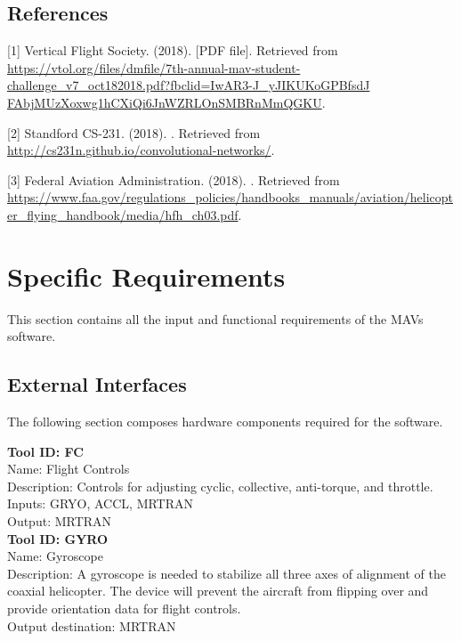\documentclass[onecolumn, oneside, letterpaper, draftclsnofoot, 10pt, compsoc]{IEEEtran}
\begin{document}
\subsection{References}
[1]
\newblock Vertical Flight Society. (2018).
 [PDF file].
\newblock Retrieved from \url{https://vtol.org/files/dmfile/7th-annual-mav-student-challenge_v7_oct182018.pdf?fbclid=IwAR3-J_yJIKUKoGPBfsdJ}\\ \url{FAbjMUzXoxwg1hCXiQi6JnWZRLOnSMBRnMmQGKU}.

[2]
\newblock Standford CS-231. (2018).
.
\newblock Retrieved from \url{http://cs231n.github.io/convolutional-networks/}.

[3]
\newblock Federal Aviation Administration. (2018).
.
\newblock Retrieved from \url{https://www.faa.gov/regulations_policies/handbooks_manuals/aviation/helicopter_flying_handbook/media/hfh_ch03.pdf}.

\section{Specific Requirements}
This section contains all the input and functional requirements of the MAV\textquotesingle s software.

\subsection{External Interfaces}
The following section composes hardware components required for the software.

\noindent
\textbf{Tool ID: FC}\\
Name: Flight Controls\\
Description: Controls for adjusting cyclic, collective, anti-torque, and throttle.\\
Inputs: GRYO, ACCL, MRTRAN\\
Output: MRTRAN\\

\noindent
\textbf{Tool ID: GYRO}\\
Name: Gyroscope\\
Description: A gyroscope is needed to stabilize all three axes of alignment of the coaxial helicopter. The device will prevent the aircraft from flipping over and provide orientation data for flight controls.\\
Output destination: MRTRAN\\
\end{document}
